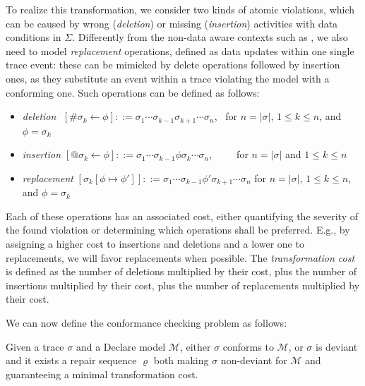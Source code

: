 To realize this transformation, we consider two kinds of atomic violations, which can be caused by wrong (\textit{deletion}) or missing (\textit{insertion}) activities with data conditions in $\Sigma$. Differently from the non-data aware contexts such as \cite{XuLZ17a,MaggiMCA18}, we also need to model \textit{replacement} operations, defined as data updates within one single trace event: these can be mimicked by delete operations followed by insertion ones, as they substitute an event within a trace violating the model  with a conforming one. Such operations can be defined as follows:
\begin{itemize}
	\item \textit{deletion}\,\, $[\#\sigma_k\leftarrow \phi]::= \sigma_1\cdots\sigma_{k-1}\sigma_{k+1}\cdots \sigma_n$,\,\,\, for $n=|\sigma|$, $1\leq k\leq n$, and $\phi=\sigma_k$
	\item \textit{insertion} $[@\sigma_k\leftarrow \phi]::= \sigma_1\cdots\sigma_{k-1}\phi\sigma_{k}\cdots \sigma_n$,\,\,\,\,\,\,\,\,\,\,\,\,\, for $n=|\sigma|$ and $1\leq k\leq n$
	\item \textit{replacement} $[\sigma_k[\phi\mapsto\phi']]::=\sigma_1\cdots \sigma_{k-1}\phi'\sigma_{k+1}\cdots\sigma_n$ for $n=|\sigma|$, $1\leq k\leq n$, and $\phi=\sigma_k$
\end{itemize}
Each of these operations has an associated cost, either quantifying the severity of the found violation or determining which operations shall be preferred. E.g., by assigning a higher cost to insertions and deletions and a lower one to replacements, we will favor replacements when possible. The \textit{transformation cost} is defined as the number of deletions multiplied by their cost, plus the number of insertions multiplied by their cost, plus the number of replacements multiplied by their cost. 

We can now define the conformance checking problem as follows:
\begin{definition}
Given a trace $\sigma$ and a Declare model $\mathcal{M}$, either $\sigma$ conforms to $\mathcal{M}$, or $\sigma$ is deviant and it exists a repair sequence $\varrho$ both making $\sigma$ non-deviant for $\mathcal{M}$ and guaranteeing a minimal transformation cost.
\end{definition}

